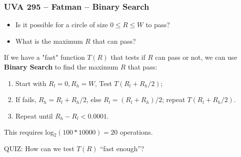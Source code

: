 \begin{frame}
  \frametitle{UVA 295 -- Fatman -- Binary Search}

  {\smaller
    \begin{block}{}
      \begin{itemize}
      \item Is it possible for a circle of size $0 \leq R \leq W$ to pass?
      \item What is the maximum $R$ that can pass?
      \end{itemize}
    \end{block}

    If we have a "fast" function $T(R)$ that tests if $R$ can pass or not, we can use {\bf Binary Search} to find the maximum $R$ that pass:

    \bigskip

    \begin{enumerate}
    \item Start with $R_l = 0, R_h = W$, Test $T(R_l+R_h /2)$;
    \item If fails, $R_h = R_l+R_h/2$, else $R_l = (R_l+R_h)/2$; repeat $T(R_l+R_h/2)$.
    \item Repeat until $R_h - R_l < 0.0001$.
    \end{enumerate}

    This requires log$_2(100*10000) = 20$ operations.

    \bigskip

    \alert{QUIZ:} How can we test $T(R)$ ``fast enough''?
  }
\end{frame}

